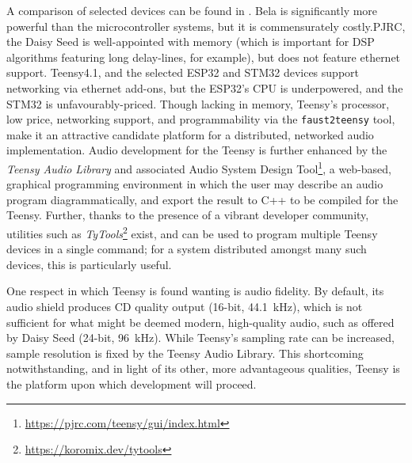 A comparison of selected devices can be found in
.
Bela is significantly more powerful than the microcontroller systems, but it is
commensurately costly.PJRC, the
Daisy Seed is well-appointed with memory (which is important for DSP algorithms
featuring long delay-lines, for example), but does not feature ethernet support.
Teensy4.1, and the selected ESP32 and STM32 devices support networking via
ethernet add-ons, but the ESP32's CPU is underpowered, and the STM32 is
unfavourably-priced.
Though lacking in memory, Teensy's processor, low price, networking support, and
programmability via the \texttt{faust2teensy} tool, make it an attractive
candidate platform for a distributed, networked audio implementation.
Audio development for the Teensy is further enhanced by the \textit{Teensy
Audio Library} and associated Audio System Design Tool\footnote{
    \url{https://pjrc.com/teensy/gui/index.html}
}, a web-based, graphical programming environment in which the user may describe
an audio program diagrammatically, and export the result to C++ to be compiled
for the Teensy.
Further, thanks to the presence of a vibrant developer community, utilities such
as \textit{TyTools}\footnote{\url{https://koromix.dev/tytools}} exist, and can
be used to program multiple Teensy devices in a single command;
for a system distributed amongst many such devices, this is particularly useful.

One respect in which Teensy is found wanting is audio fidelity.
By default, its audio shield produces CD quality output (16-bit,
\qty{44.1}{\kHz}), which is not sufficient for what might be deemed modern,
high-quality audio, such as offered by Daisy Seed (24-bit, \qty{96}{\kHz}).
While Teensy's sampling rate can be increased, sample resolution is fixed by
the Teensy Audio Library.
This shortcoming notwithstanding, and in light of its other, more advantageous
qualities, Teensy is the platform upon which development will proceed.
